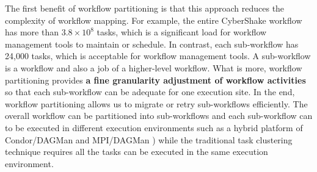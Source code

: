 The first benefit of workflow partitioning is that this approach reduces the complexity of workflow mapping. For example, the entire CyberShake workflow has more than $3.8\times 10^8$ tasks, which is a significant load for workflow management tools to maintain or schedule. In contrast, each sub-workflow has 24,000 tasks, which is acceptable for workflow management tools. A sub-workflow is a workflow and also a job of a higher-level workflow. What is more, workflow partitioning provides \textbf{a fine granularity adjustment of workflow activities} so that each sub-workflow can be adequate for one execution site. In the end, workflow partitioning allows us to migrate or retry sub-workflows efficiently. The overall workflow can be partitioned into sub-workflows and each sub-workflow can to be executed in different execution environments such as a hybrid platform of Condor/DAGMan \cite{DAGMan} and MPI/DAGMan \cite{Rynge2012}) while the traditional task clustering technique requires all the tasks can be executed in the same execution environment. 



 


